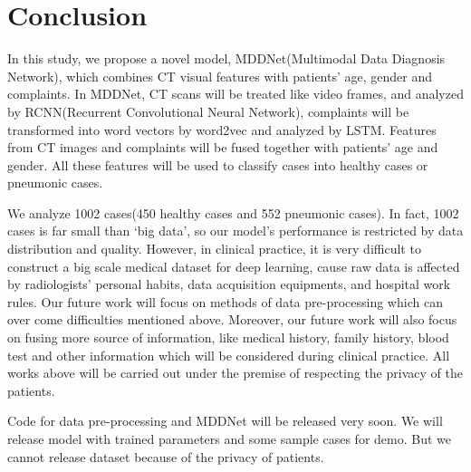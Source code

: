 \section{Conclusion}
\label{conclude}
In this study, we propose a novel model, MDDNet(Multimodal Data Diagnosis Network), which combines CT visual features with patients' age, gender and complaints. In MDDNet, CT scans will be treated like video frames, and analyzed by RCNN(Recurrent Convolutional Neural Network), complaints will be transformed into word vectors by word2vec and analyzed by LSTM. Features from CT images and complaints will be fused together with patients' age and gender. All these features will be used to classify cases into healthy cases or pneumonic cases.

We analyze 1002 cases(450 healthy cases and 552 pneumonic cases). In fact, 1002 cases is far small than `big data', so our model's performance is restricted by data distribution and quality. However, in clinical practice, it is very difficult to construct a big scale medical dataset for deep learning, cause raw data is affected by radiologists' personal habits, data acquisition equipments, and hospital work rules. Our future work will focus on methods of data pre-processing which can over come difficulties mentioned above.
Moreover, our future work will also focus on fusing more source of information, like medical history, family history, blood test and other information which will be considered during clinical practice. All works above will be carried out under the premise of respecting the privacy of the patients.
 
Code for data pre-processing and MDDNet will be released very soon. We will release model with trained parameters and some sample cases for demo. But we cannot release dataset because of the privacy of patients. 
